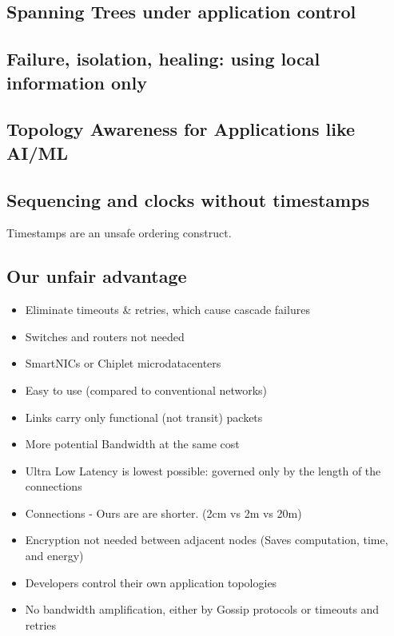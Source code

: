 \subsection{Spanning Trees under application control}

\subsection{Failure, isolation, healing: using local information only}
\subsection{Topology Awareness for Applications like AI/ML}

\subsection{Sequencing and clocks without timestamps}

Timestamps are an unsafe ordering construct.

\subsection{Our unfair advantage}
\begin{itemize}
  \item Eliminate timeouts \& retries, which cause cascade failures
  \item Switches and routers not needed
  \item SmartNICs or Chiplet microdatacenters
  \item Easy to use (compared to conventional networks)
  \item Links carry only functional (not transit) packets
  \item More potential Bandwidth at the same cost
  \item Ultra Low Latency is lowest possible: governed only by the length of the connections
  \item Connections - Ours are are shorter.  (2cm vs 2m vs 20m)
  \item Encryption not needed between adjacent nodes (Saves computation, time, and energy)
  \item Developers control their own application topologies
  \item No bandwidth amplification, either by Gossip protocols or timeouts and retries
\end{itemize}



